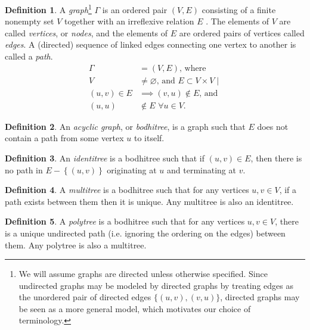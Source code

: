 \documentclass[pra,twocolumn,groupedaddress,10pt]{revtex4}
\theoremstyle{definition}
\newtheorem{defn}{Definition}[section]
\begin{document}
\begin{defn}
	A \emph{graph}\footnote{We will assume graphs are directed unless otherwise specified. Since undirected graphs may be modeled by directed graphs by treating edges as the unordered pair of directed edges $\{(u,v),(v,u)\}$\cite{chartrand}, directed graphs may be seen as a more general model, which motivates our choice of terminology.} $\Gamma$ is an ordered pair $(V, E)$ consisting of a finite nonempty set $V$ together with an irreflexive relation $E$ \cite{chartrand}. The elements of $V$ are called \emph{vertices}, or \emph{nodes}, and the elements of $E$ are ordered pairs of vertices called \emph{edges}. A (directed) sequence of linked edges connecting one vertex to another is called a \emph{path}.
	\begin{equation}
		\begin{split}
			\Gamma &= (V, E) \text{, where} \\
			V &\neq \varnothing \text{, and } E \subset V \times V \mid \\
			(u,v) \in E &\implies (v,u) \notin E \text{, and} \\
			(u,u) &\notin E \,\, \forall u \in V .
		\end{split}
	\end{equation}
\end{defn}

\begin{defn}
	An \emph{acyclic graph}, or \emph{bodhitree}, is a graph such that $E$ does not contain a path from some vertex $u$ to itself.
\end{defn}

\begin{defn}
	An \emph{identitree} is a bodhitree such that if $(u, v) \in E$, then there is no path in $E - \left\{\left(u, v\right)\right\}$ originating at $u$ and terminating at $v$.
\end{defn}

\begin{defn}
	A \emph{multitree} is a bodhitree such that for any vertices $u, v \in V$, if a path exists between them then it is unique. Any multitree is also an identitree.
\end{defn}

\begin{defn}
	A \emph{polytree} is a bodhitree such that for any vertices $u, v \in V$, there is a unique undirected path (i.e. ignoring the ordering on the edges) between them. Any polytree is also a multitree.
\end{defn}
\end{document}
